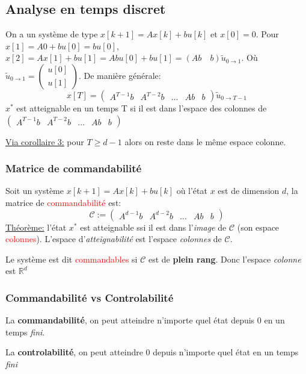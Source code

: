 \documentclass{report}
\begin{document}
\subsection{Analyse en temps discret}
On a un système de type $x[k+1] = A x[k] + bu[k]$ et $x[0] = 0$. Pour $x[1] = A 0 + bu[0] = bu[0]$, $x[2] = Ax[1] + bu[1] = Abu[0] +bu[1] = (Ab \quad b) \tilde{u}_{0 \rightarrow 1} $. Où $\tilde{u}_{0 \rightarrow 1} = \begin{pmatrix}
u[0]\\
u[1]
\end{pmatrix}
$. De manière générale:
\begin{equation}
x[T] = \begin{pmatrix}
A^{T-1} b & A^{T-2} b & \hdots & Ab & b
\end{pmatrix} \tilde{u}_{0 \rightarrow T-1}
\end{equation}
$x^{\ast}$ est atteignable en un temps T si il est dans l'espace des colonnes de $\begin{pmatrix}
A^{T-1} b & A^{T-2} b & \hdots & Ab & b
\end{pmatrix}$\par \noindent
\underline{Via corollaire 3:} pour $T \geqslant d-1$ alors on reste dans le même espace colonne.

\subsubsection{Matrice de commandabilité}
Soit un système $x[k+1] = Ax[k] + bu[k]$ où l'état $x$ est de dimension $d$, la matrice de \textcolor{red}{commandabilité} est:
\begin{equation}
\mathcal{C} := \begin{pmatrix}
A^{d-1} b & A^{d-2} b & \hdots & Ab & b
\end{pmatrix}
\end{equation}
\noindent \underline{Théorème:} l'état $x^{\ast}$ est atteignable ssi il est dans l'\textit{image} de $\mathcal{C}$ (son espace \textcolor{red}{colonnes}). L'espace d'\textit{atteignabilité} est l'espace \textit{colonnes} de $\mathcal{C}$.\par 
\noindent Le système est dit \textcolor{red}{commandables} si $\mathcal{C}$ est de \textbf{plein rang}. Donc l'espace \textit{colonne} est $\mathbb{R}^d$

\subsubsection{Commandabilité vs Controlabilité}
La \textbf{commandabilité}, on peut atteindre n'importe quel état depuis 0 en un temps \textit{fini}. \par 
La \textbf{controlabilité}, on peut atteindre 0 depuis n'importe quel état en un temps \textit{fini}
\end{document}
